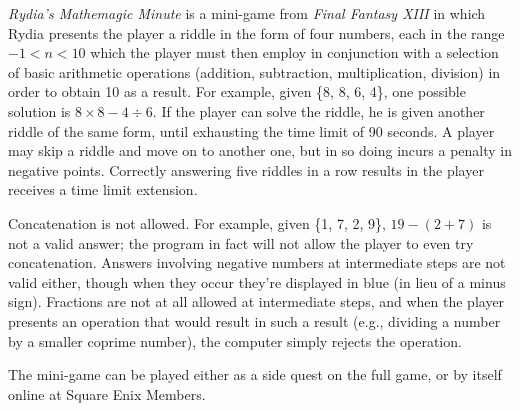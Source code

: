 \documentclass[12pt]{article}
\begin{document}
{\em Rydia's Mathemagic Minute} is a mini-game from {\it Final Fantasy XIII} in which Rydia presents the player a riddle in the form of four numbers, each in the range $-1 < n < 10$ which the player must then employ in conjunction with a selection of basic arithmetic operations (addition, subtraction, multiplication, division) in order to obtain 10 as a result. For example, given \{8, 8, 6, 4\}, one possible solution is $8 \times 8 - 4 \div 6$. If the player can solve the riddle, he is given another riddle of the same form, until exhausting the time limit of 90 seconds. A player may skip a riddle and move on to another one, but in so doing incurs a penalty in negative points. Correctly answering five riddles in a row results in the player receives a time limit extension.

Concatenation is not allowed. For example, given \{1, 7, 2, 9\}, $19 - (2 + 7)$ is not a valid answer; the program in fact will not allow the player to even try concatenation. Answers involving negative numbers at intermediate steps are not valid either, though when they occur they're displayed in blue (in lieu of a minus sign). Fractions are not at all allowed at intermediate steps, and when the player presents an operation that would result in such a result (e.g., dividing a number by a smaller coprime number), the computer simply rejects the operation.

The mini-game can be played either as a side quest on the full game, or by itself online at {\PMlinkescapetext Square Enix Members}.
\end{document}
